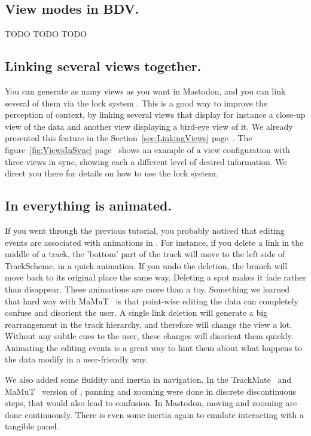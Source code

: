 \subsection{View modes in BDV.}
\label{sec:BDVViewModes}

TODO TODO TODO



\subsection{Linking several views together.}

You can generate as many views as you want in Mastodon, and you can link several of them via the lock system .
This is a good way to improve the perception of context, by linking several views that display for instance a close-up view of the data and another view displaying a bird-eye view of it.
We already presented this feature in the Section~\ref{sec:LinkingViews} page~\pageref{sec:LinkingViews}. 
The figure~\ref{fig:ViewsInSync} page~\pageref{fig:ViewsInSync} shows an example of a view configuration with three views in sync, showing each a different level of desired information.
We direct you there for details on how to use the lock system.


\subsection{In \TrackScheme everything is animated.}

If you went through the previous tutorial, you probably noticed that editing events are associated with animations in \TrackScheme.
For instance, if you delete a link in the middle of a track, the 'bottom' part of the track will move to the left side of TrackScheme, in a quick animation.
If you undo the deletion, the branch will move back to its original place the same way. 
Deleting a spot makes it fade rather than disappear.
These animations are more than a toy.
Something we learned that hard way with MaMuT~\cite{MaMuT} is that point-wise editing the data can completely confuse and disorient the user.
A single link deletion will generate a big rearrangement in the track hierarchy, and therefore will change the \TrackScheme view a lot. 
Without any subtle cues to the user, these changes will disorient them quickly.
Animating the editing events is a great way to hint them about what happens to the data modify in a user-friendly way.

We also added some fluidity and inertia in \TrackScheme navigation. 
In the TrackMate~\cite{TrackMate} and MaMuT~\cite{MaMuT} version of \TrackScheme, panning and zooming were done in discrete discontinuous steps, that would also lead to confusion.
In Mastodon, moving and zooming are done continuously. 
There is even some inertia again to emulate interacting with a tangible panel.



